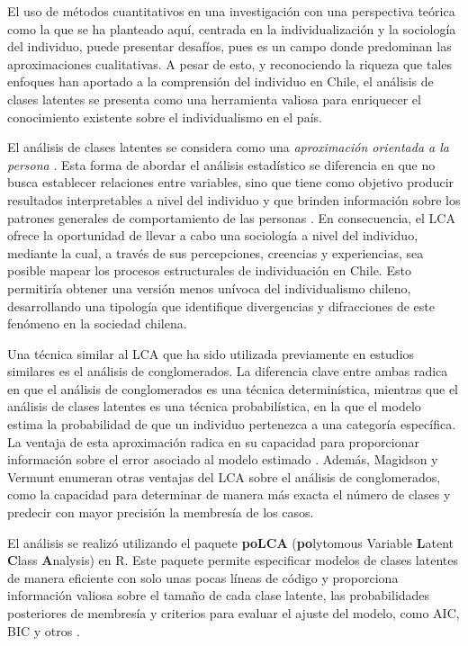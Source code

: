 \documentclass[12pt,twoside]{templates/facsothesis}
\begin{document}
El uso de métodos cuantitativos en una investigación con una perspectiva teórica como la que se ha planteado aquí, centrada en la individualización y la sociología del individuo, puede presentar desafíos, pues es un campo donde predominan las aproximaciones cualitativas. A pesar de esto, y reconociendo la riqueza que tales enfoques han aportado a la comprensión del individuo en Chile, el análisis de clases latentes se presenta como una herramienta valiosa para enriquecer el conocimiento existente sobre el individualismo en el país.

El análisis de clases latentes se considera como una \emph{aproximación orientada a la persona} \citep{collins2010}. Esta forma de abordar el análisis estadístico se diferencia en que no busca establecer relaciones entre variables, sino que tiene como objetivo producir resultados interpretables a nivel del individuo y que brinden información sobre los patrones generales de comportamiento de las personas \citep{bergman2015}. En consecuencia, el LCA ofrece la oportunidad de llevar a cabo una sociología a nivel del individuo, mediante la cual, a través de sus percepciones, creencias y experiencias, sea posible mapear los procesos estructurales de individuación en Chile. Esto permitiría obtener una versión menos unívoca del individualismo chileno, desarrollando una tipología que identifique divergencias y difracciones de este fenómeno en la sociedad chilena.

Una técnica similar al LCA que ha sido utilizada previamente en estudios similares \citep{rojas2008} es el análisis de conglomerados. La diferencia clave entre ambas radica en que el análisis de conglomerados es una técnica determinística, mientras que el análisis de clases latentes es una técnica probabilística, en la que el modelo estima la probabilidad de que un individuo pertenezca a una categoría específica. La ventaja de esta aproximación radica en su capacidad para proporcionar información sobre el error asociado al modelo estimado \citep{magidson2002}. Además, Magidson y Vermunt \citeyearpar{magidson2002} enumeran otras ventajas del LCA sobre el análisis de conglomerados, como la capacidad para determinar de manera más exacta el número de clases y predecir con mayor precisión la membresía de los casos.

El análisis se realizó utilizando el paquete \textbf{poLCA} (\textbf{po}lytomous Variable \textbf{L}atent \textbf{C}lass \textbf{A}nalysis) en R. Este paquete permite especificar modelos de clases latentes de manera eficiente con solo unas pocas líneas de código y proporciona información valiosa sobre el tamaño de cada clase latente, las probabilidades posteriores de membresía y criterios para evaluar el ajuste del modelo, como AIC, BIC y otros \citep{linzer2011}.
\end{document}
